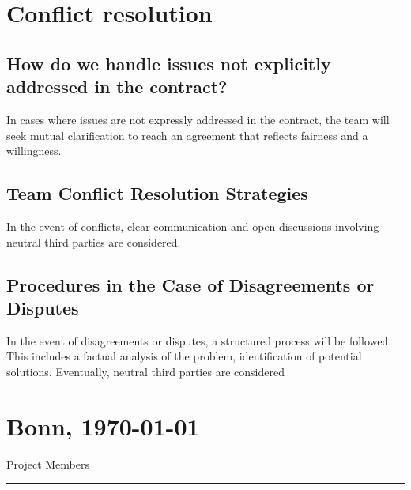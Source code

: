 \documentclass{article}
\begin{document}
\section{Conflict resolution}
\subsection{How do we handle issues not explicitly addressed in the contract?}
In cases where issues are not expressly addressed in the contract, the team will seek mutual clarification to reach an agreement that reflects fairness and a willingness.

\subsection{Team Conflict Resolution Strategies}
In the event of conflicts, clear communication and open discussions involving neutral third parties are considered.
\subsection{Procedures in the Case of Disagreements or Disputes}
In the event of disagreements or disputes, a structured process will be followed.
This includes a factual analysis of the problem, identification of potential solutions.
Eventually, neutral third parties are considered

\vfill
\section*{Bonn, \today}

\begin{minipage}{1\textwidth}
	\centering
	Project Members
	\hrule
\end{minipage}
\end{document}
